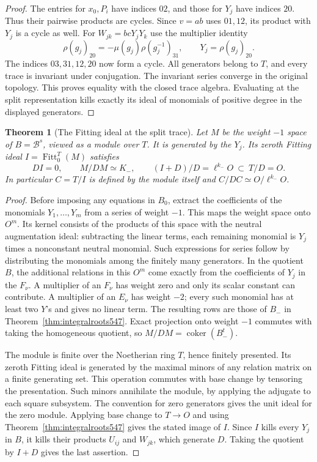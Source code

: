 \documentclass[a4paper,11pt]{article}
\newtheorem{theorem}[proposition]{Theorem}
\theoremstyle{definition}
\theoremstyle{remark}
\numberwithin{equation}{section}
\begin{document}
\begin{proof}
The entries for \(x_0,P_i\) have indices \(02\), and those for
\(Y_j\) have indices \(20\). Thus their pairwise products are
cycles. Since \(v=ab\) uses \(01,12\), its product with \(Y_j\)
is a cycle as well. For \(W_{jk}=bcY_jY_k\) use the multiplier
identity
\[
  \rho(g_j)_{20}=-\mu(g_j)\rho(g_j^{-1})_{31},
     \qquad Y_j=\rho(g_j)_{20}.
\]
The indices \(03,31,12,20\) now form a cycle. All generators
belong to \(T\), and every trace is invariant under conjugation.
The invariant series converge in the original topology. This
proves equality with the closed trace algebra. Evaluating at
the split representation kills exactly its ideal of monomials
of positive degree in the displayed generators.
\end{proof}

\begin{theorem}[The Fitting ideal at the split trace]
\leavevmode\label{thm:tracefitting548}
Let \(M\) be the weight \(-1\) space of \(B=\mathcal B^s\),
viewed as a module over \(T\). It is generated by the \(Y_j\).
Its zeroth Fitting ideal \(I=\operatorname{Fitt}_0^T(M)\)
satisfies
\[
    DI=0,\qquad M/DM\simeq K_-,\qquad
    (I+D)/D=\ell^{k_-}O\ \subset\ T/D=O .
\]
In particular \(C=T/I\) is defined by the module itself and
\(C/DC\simeq O/\ell^{k_-}O\).
\end{theorem}
\begin{proof}
Before imposing any equations in \(B_0\), extract the coefficients
of the monomials \(Y_1,\ldots,Y_m\) from a series of weight \(-1\).
This maps the weight space onto \(O^m\). Its kernel consists of
the products of this space with the neutral augmentation ideal:
subtracting the linear terms, each remaining monomial is \(Y_j\)
times a nonconstant neutral monomial. Such expressions for series
follow by distributing the monomials among the finitely many
generators. In the quotient \(B\), the additional relations in
this \(O^m\) come exactly from the coefficients of \(Y_j\) in
the \(F_\nu\). A multiplier of an \(F_\nu\) has weight zero and
only its scalar constant can contribute. A multiplier of an
\(E_\nu\) has weight \(-2\); every such monomial has at least two
\(Y\)'s and gives no linear term. The resulting rows are those
of \(B_-\) in Theorem~\ref{thm:integralroots547}. Exact projection
onto weight \(-1\) commutes with taking the homogeneous quotient,
so \(M/DM=\operatorname{coker}(B_-^t)\).

The module is finite over the Noetherian ring \(T\), hence
finitely presented. Its zeroth Fitting ideal is generated by
the maximal minors of any relation matrix on a finite generating
set. This operation commutes with base change by tensoring the
presentation. Such minors annihilate the module, by applying
the adjugate to each square subsystem. The convention for zero
generators gives the unit ideal for the zero module. Applying
base change to \(T\to O\) and using
Theorem~\ref{thm:integralroots547} gives the stated image of \(I\).
Since \(I\) kills every \(Y_j\) in \(B\), it kills their products
\(U_{ij}\) and \(W_{jk}\), which generate \(D\). Taking the
quotient by \(I+D\) gives the last assertion.
\end{proof}
\end{document}
